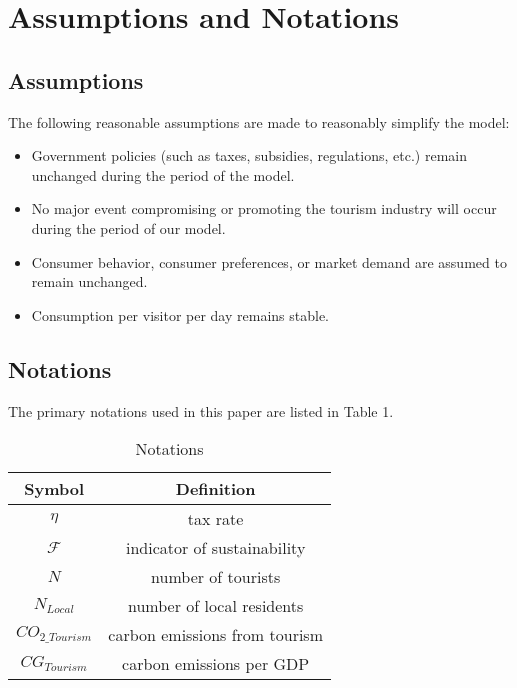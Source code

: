 \section{Assumptions and Notations}

\subsection{Assumptions}

The following reasonable assumptions are made to reasonably simplify the model:

\begin{itemize}
  \item Government policies (such as taxes, subsidies, regulations, etc.) remain unchanged during the period of the model.
  \item No major event compromising or promoting the tourism industry will occur during the period of our model.
  \item Consumer behavior, consumer preferences, or market demand are assumed to remain unchanged.
  \item Consumption per visitor per day remains stable.
\end{itemize}


\subsection{Notations}

The primary notations used in this paper are listed in Table 1.

\begin{table}[!htbp]
  \begin{center}
  \caption{Notations}
  \begin{tabular}{cc}
    \toprule
    \multicolumn{1}{m{3cm}}{\centering Symbol}
    &\multicolumn{1}{m{8cm}}{\centering Definition}\\
    \midrule
    $\eta$         &   tax rate\\
    $\mathcal{F}$         &   indicator of sustainability\\
    $N$    &   number of tourists\\
    $N_{Local}$    &   number of local residents\\
    $CO_{2\_Tourism}$    &   carbon emissions from tourism\\
    $CG_{Tourism}$    &   carbon emissions per GDP\\
    \bottomrule
  \end{tabular}
  \end{center}
\end{table}
